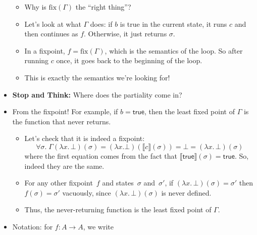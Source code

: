 \documentclass{lecturenotes}
\newcommand{\itrue}{\textsf{true}}
\begin{document}
\begin{itemize}
\begin{itemize}
\begin{itemize}
  \end{itemize}
\item Why is $\text{fix}(\Gamma)$ the ``right thing''?
\item Let's look at what $\Gamma$ does: if $b$ is true in the current state, it runs $c$ and then continues as $f$.
  Otherwise, it just returns $\sigma$.
\item In a fixpoint, $f = \text{fix}(\Gamma)$, which is the semantics of the loop.
  So after running $c$ once, it goes back to the beginning of the loop.
\item This is exactly the semantics we're looking for!
\end{itemize}
\item \textbf{Stop and Think:} Where does the partiality come in?
\item From the fixpoint! 
  For example, if $b = \itrue$, then the least fixed point of $\Gamma$ is the function that never returns.
  \begin{itemize}
  \item Let's check that it is indeed a fixpoint:
    $$\forall \sigma.\;\Gamma(\lambda x.\,\bot)(\sigma) = (\lambda x. \bot)(\llbracket c \rrbracket(\sigma)) = \bot = (\lambda x.\,\bot)(\sigma)$$
    where the first equation comes from the fact that $\llbracket \itrue \rrbracket(\sigma) = \itrue$.
    So, indeed they are the same.
  \item For any other fixpoint~$f$ and states~$\sigma$ and~$\sigma'$, if $(\lambda x.\, \bot)(\sigma) = \sigma'$ then $f(\sigma) = \sigma'$ vacuously, since $(\lambda x.\,\bot)(\sigma)$ is never defined.
  \item Thus, the never-returning function is the least fixed point of $\Gamma$.
  \end{itemize}
\item Notation: for $f : A \to A$, we write
\end{itemize}
\end{document}
